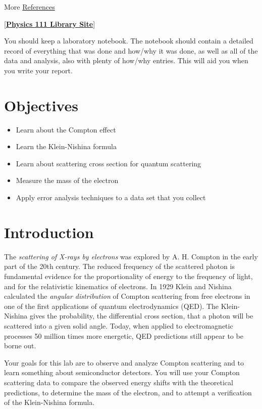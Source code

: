 \documentclass{../lab}
\begin{document}
More \hyperref[sec:References]{References}

[\href{\LabReprints}{\textbf{Physics 111 Library Site}}]

You should keep a laboratory notebook. The notebook should contain a detailed record of everything that was done and how/why it was done, as well as all of the data and analysis, also with plenty of how/why entries. This will aid you when you write your report.

\section{Objectives}

\begin{itemize}
    \item Learn about the Compton effect

    \item Learn the Klein-Nishina formula

    \item Learn about scattering cross section for quantum scattering

    \item Measure the mass of the electron

    \item Apply error analysis techniques to a data set that you collect

\end{itemize}

\section{Introduction}

The \emph{scattering of X-rays by electrons }was explored by A. H. Compton in the early part of the 20th century. The reduced frequency of the scattered photon is fundamental evidence for the proportionality of energy to the frequency of light, and for the relativistic kinematics of electrons. In 1929 Klein and Nishina calculated the \emph{angular distribution} of Compton scattering from free electrons in one of the first applications of quantum electrodynamics (QED). The Klein-Nishina gives the probability, the differential cross section, that a photon will be scattered into a given solid angle. Today, when applied to electromagnetic processes 50 million times more energetic, QED predictions still appear to be borne out.

Your goals for this lab are to observe and analyze Compton scattering and to learn something about semiconductor detectors. You will use your Compton scattering data to compare the observed energy shifts with the theoretical predictions, to determine the mass of the electron, and to attempt a verification of the Klein-Nishina formula.
\end{document}
